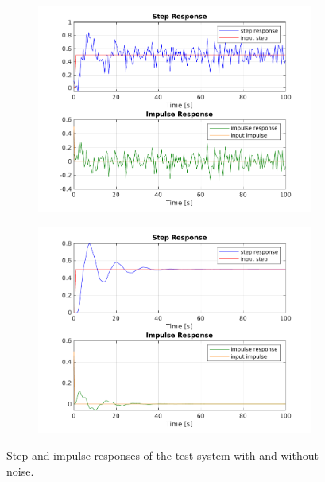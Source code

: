 \documentclass{scrartcl}
\begin{document}
\begin{figure}[h]
	\centering
	\begin{subfigure}{0.49\textwidth}
		\includegraphics[width=\textwidth]{figures/noisy_responses.pdf}
	\end{subfigure}
	\begin{subfigure}{0.49\textwidth}
		\includegraphics[width=\textwidth]{figures/noisefree.pdf}
	\end{subfigure}
	\caption{Step and impulse responses of the test system with and without noise.}\label{fig:responses}
\end{figure}
\end{document}
